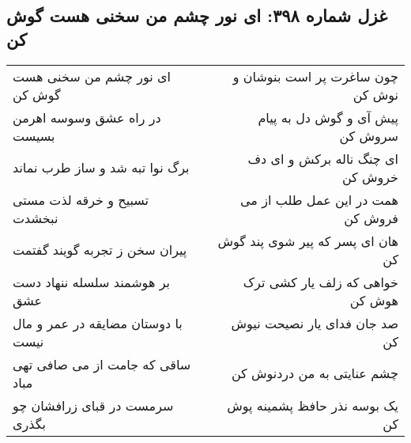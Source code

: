 \begin{center}
\section*{غزل شماره ۳۹۸: ای نور چشم من سخنی هست گوش کن}
\label{sec:sh398}
\begin{longtable}{l p{0.5cm} r}
ای نور چشم من سخنی هست گوش کن
&&
چون ساغرت پر است بنوشان و نوش کن
\\
در راه عشق وسوسه اهرمن بسیست
&&
پیش آی و گوش دل به پیام سروش کن
\\
برگ نوا تبه شد و ساز طرب نماند
&&
ای چنگ ناله برکش و ای دف خروش کن
\\
تسبیح و خرقه لذت مستی نبخشدت
&&
همت در این عمل طلب از می فروش کن
\\
پیران سخن ز تجربه گویند گفتمت
&&
هان ای پسر که پیر شوی پند گوش کن
\\
بر هوشمند سلسله ننهاد دست عشق
&&
خواهی که زلف یار کشی ترک هوش کن
\\
با دوستان مضایقه در عمر و مال نیست
&&
صد جان فدای یار نصیحت نیوش کن
\\
ساقی که جامت از می صافی تهی مباد
&&
چشم عنایتی به من دردنوش کن
\\
سرمست در قبای زرافشان چو بگذری
&&
یک بوسه نذر حافظ پشمینه پوش کن
\\
\end{longtable}
\end{center}
